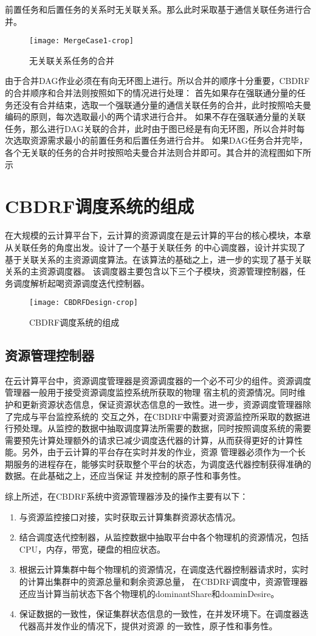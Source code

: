 前置任务和后置任务的关系时无关联关系。那么此时采取基于通信关联任务进行合并。
\begin{figure}[htbp]
\centering\texttt{[image: MergeCase1-crop]}
\caption{无关联关系任务的合并}\label{fig:MergeCase1}
\end{figure}
由于合并DAG作业必须在有向无环图上进行。所以合并的顺序十分重要，CBDRF的合并顺序和合并法则按照如下的情况进行处理：
首先如果存在强联通分量的任务还没有合并结束，选取一个强联通分量的通信关联任务的合并，此时按照哈夫曼编码的原则，每次选取最小的两个请求进行合并。
如果不存在强联通分量的关联任务，那么进行DAG关联的合并，此时由于图已经是有向无环图，所以合并时每次选取资源需求最小的前置任务和后置任务进行合并。
如果DAG任务合并完毕，各个无关联的任务的合并时按照哈夫曼合并法则合并即可。其合并的流程图如下所示

\section{CBDRF调度系统的组成}
在大规模的云计算平台下，云计算的资源调度在是云计算的平台的核心模块，本章从关联任务的角度出发。设计了一个基于关联任务
的中心调度器，设计并实现了基于关联关系的主资源调度算法。在该算法的基础之上，进一步的实现了基于关联关系的主资源调度器。
该调度器主要包含以下三个子模块，资源管理控制器，任务调度解析起喝资源调度迭代控制器。
\begin{figure}[htbp]
\centering\texttt{[image: CBDRFDesign-crop]}
\caption{CBDRF调度系统的组成}\label{fig:CBDRFDesign}
\end{figure}
\subsection{资源管理控制器}
在云计算平台中，资源调度管理器是资源调度器的一个必不可少的组件。资源调度管理器一般用于接受资源调度监控系统所获取的物理
宿主机的资源情况。同时维护和更新资源状态信息，保证资源状态信息的一致性。进一步，资源调度管理器除了完成与平台监控系统的
交互之外，在CBDRF中需要对资源监控所采取的数据进行预处理。从监控的数据中抽取调度算法所需要的数据，同时按照调度系统的需要
需要预先计算处理额外的请求已减少调度迭代器的计算，从而获得更好的计算性能。另外，由于云计算的平台存在实时并发的作业，资源
管理器必须作为一个长期服务的进程存在，能够实时获取整个平台的状态，为调度迭代器控制获得准确的数据。在此基础之上，还应当保证
并发控制的原子性和事务性。

综上所述，在CBDRF系统中资源管理器涉及的操作主要有以下：
\begin{enumerate}
\item 与资源监控接口对接，实时获取云计算集群资源状态情况。
\item 结合调度迭代控制器，从监控数据中抽取平台中各个物理机的资源情况，包括CPU，内存，带宽，硬盘的相应状态。
\item 根据云计算集群中每个物理机的资源情况，在调度迭代器控制器请求时，实时的计算出集群中的资源总量和剩余资源总量，
在CBDRF调度中，资源管理器还应当计算当前状态下各个物理机的dominantShare和doaminDesire。
\item 保证数据的一致性，保证集群状态信息的一致性，在并发环境下。在调度器迭代器高并发作业的情况下，提供对资源
的一致性，原子性和事务性。
\end{enumerate}

